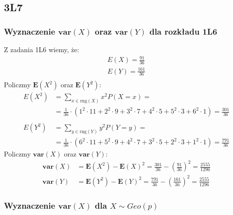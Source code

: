 \documentclass{article}
\begin{document}
\subsection{3L7}

\subsubsection*{Wyznaczenie $\mathbf{var}(X)$ oraz $\mathbf{var}(Y)$ dla rozkładu 1L6}

Z zadania 1L6 wiemy, że:
\setcounter{equation}{0}
\begin{align}
    E(X) = \frac{91}{36}\\
    E(Y) = \frac{161}{36}\\
\end{align}
Policzmy $\mathbf{E}(X^2)$ oraz $\mathbf{E}(Y^2)$:
\begin{align}
    E(X^2) &= \sum_{x\in\text{rng}(X)} x^2 P(X=x) =\\
    &= \frac{1}{36}\cdot\left(1^2\cdot 11 + 2^2\cdot 9 + 3^2\cdot 7+4^2\cdot5 + 5^2\cdot 3+6^2\cdot 1\right)
    = \frac{301}{36}\\\\
    E(Y^2) &= \sum_{y\in\text{rng}(Y)} y^2 P(Y=y) =\\
    &= \frac{1}{36}\cdot\left(6^2\cdot 11 + 5^2\cdot 9 + 4^2\cdot 7 + 3^2\cdot 5 + 2^2\cdot 3 + 1^2\cdot 1 \right)
    = \frac{791}{36}
\end{align}
Policzmy $\mathbf{var}(X)$ oraz $\mathbf{var}(Y)$:
\begin{align}
    \mathbf{var}(X) &= \mathbf{E}(X^2) - \mathbf{E}(X)^2 = \frac{301}{36} - \left(\frac{91}{36}\right)^2 = \frac{2555}{1296}\\
    \mathbf{var}(Y) &= \mathbf{E}(Y^2) - \mathbf{E}(Y)^2 = \frac{791}{36} - \left(\frac{161}{36}\right)^2  = \frac{2555}{1296}
\end{align}

\subsubsection*{Wyznaczenie $\mathbf{var}(X)$ dla $X\sim Geo(p)$}
\end{document}
